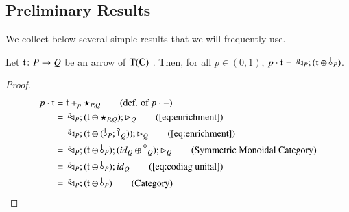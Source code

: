 \subsection{Preliminary Results}
We collect below several simple results that we will frequently use.

\begin{lemma}\label{lemma:pcdot}
Let $\mathfrak{t}\colon P \to Q$ be an arrow of $\mathbf{T}(\mathbf{C})$ . Then, for all $p\in(0,1)$, $p\cdot \t =\, \diagp{P};(\t \oplus \bang{P})$.
\end{lemma}
\begin{proof}
\begin{align*}
p\cdot \t &= \t+_p \star_{P,Q} \tag{def. of $p\cdot -$}\\
&=\, \diagp{P} ; (\t \oplus \star_{P,Q}) ; \codiag{Q} \tag{\ref{eq:enrichment}}\\
&=\, \diagp{P} ; (\t \oplus (\bang{P}; \cobang{Q})); \codiag{Q} \tag{\ref{eq:enrichment}}\\
&=\, \diagp{P} ; (\t \oplus  \bang{P}) ;(\id{Q} \oplus \cobang{Q}) ; \codiag{Q} \tag{Symmetric Monoidal Category}\\
&=\, \diagp{P} ; (\t \oplus  \bang{P}) ;\id{Q} \tag{\ref{eq:codiag unital}} \\
&=\, \diagp{P} ; (\t \oplus  \bang{P})  \tag{Category} 
\end{align*}
\end{proof}


